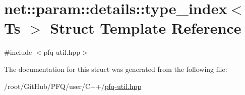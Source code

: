 \hypertarget{structnet_1_1param_1_1details_1_1type__index}{\section{net\-:\-:param\-:\-:details\-:\-:type\-\_\-index$<$ Ts $>$ Struct Template Reference}
\label{structnet_1_1param_1_1details_1_1type__index}
}


{\ttfamily \#include $<$pfq-\/util.\-hpp$>$}



The documentation for this struct was generated from the following file\-:\begin{DoxyCompactItemize}
\item 
/root/\-Git\-Hub/\-P\-F\-Q/user/\-C++/\hyperlink{pfq-util_8hpp}{pfq-\/util.\-hpp}\end{DoxyCompactItemize}
